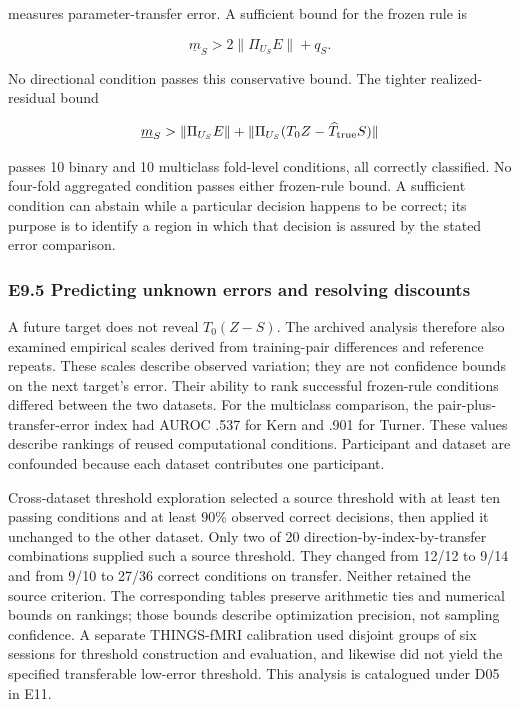 \documentclass[11pt,a4paper]{article}
\begin{document}
\par
\noindent\begin{minipage}{\linewidth}

measures parameter-transfer error. A sufficient bound for the frozen
rule is

\[
\underline m_S>2\|\Pi_{U_S}E\|+q_S.
\]

\end{minipage}\par

\par
\noindent\begin{minipage}{\linewidth}

No directional condition passes this conservative bound. The tighter
realized-residual bound

\[
\underline m_S>\|\Pi_{U_S}E\|
+\|\Pi_{U_S}(T_0Z-\widehat T_{\rm true}S)\|
\]

\end{minipage}\par

passes 10 binary and 10 multiclass fold-level conditions, all correctly
classified. No four-fold aggregated condition passes either frozen-rule
bound. A sufficient condition can abstain while a particular decision
happens to be correct; its purpose is to identify a region in which that
decision is assured by the stated error comparison.

\subsubsection{E9.5 Predicting unknown errors and resolving
discounts}\label{e9.5-predicting-unknown-errors-and-resolving-discounts}

A future target does not reveal \(T_0(Z-S)\). The archived analysis
therefore also examined empirical scales derived from training-pair
differences and reference repeats. These scales describe observed
variation; they are not confidence bounds on the next target's error.
Their ability to rank successful frozen-rule conditions differed between
the two datasets. For the multiclass comparison, the
pair-plus-transfer-error index had AUROC .537 for Kern and .901 for
Turner. These values describe rankings of reused computational
conditions. Participant and dataset are confounded because each dataset
contributes one participant.

Cross-dataset threshold exploration selected a source threshold with at
least ten passing conditions and at least 90\% observed correct
decisions, then applied it unchanged to the other dataset. Only two of
20 direction-by-index-by-transfer combinations supplied such a source
threshold. They changed from 12/12 to 9/14 and from 9/10 to 27/36
correct conditions on transfer. Neither retained the source criterion.
The corresponding tables preserve arithmetic ties and numerical bounds
on rankings; those bounds describe optimization precision, not sampling
confidence. A separate THINGS-fMRI calibration used disjoint groups of
six sessions for threshold construction and evaluation, and likewise did
not yield the specified transferable low-error threshold. This analysis
is catalogued under D05 in E11.
\end{document}
